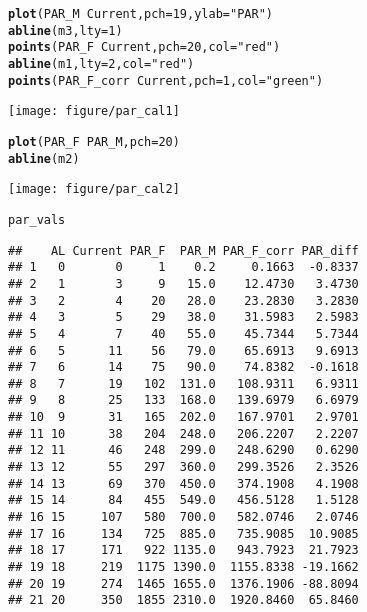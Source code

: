 \documentclass[12pt,a4paper,draft]{article}\usepackage[]{graphicx}\usepackage[]{color}
\makeatletter
\def\maxwidth{ %
  \ifdim\Gin@nat@width>\linewidth
    \linewidth
  \else
    \Gin@nat@width
  \fi
}
\newcommand{\hlnum}[1]{\textcolor[rgb]{0.686,0.059,0.569}{#1}}%
\newcommand{\hlstr}[1]{\textcolor[rgb]{0.192,0.494,0.8}{#1}}%
\newcommand{\hlopt}[1]{\textcolor[rgb]{0,0,0}{#1}}%
\newcommand{\hlstd}[1]{\textcolor[rgb]{0.345,0.345,0.345}{#1}}%
\newcommand{\hlkwc}[1]{\textcolor[rgb]{0.333,0.667,0.333}{#1}}%
\newcommand{\hlkwd}[1]{\textcolor[rgb]{0.737,0.353,0.396}{\textbf{#1}}}%
\newenvironment{kframe}{%
 \def\at@end@of@kframe{}%
 \ifinner\ifhmode%
  \def\at@end@of@kframe{\end{minipage}}%
  \begin{minipage}{\columnwidth}%
 \fi\fi%
 \def\FrameCommand##1{\hskip\@totalleftmargin \hskip-\fboxsep
 \colorbox{shadecolor}{##1}\hskip-\fboxsep
     \hskip-\linewidth \hskip-\@totalleftmargin \hskip\columnwidth}%
 \MakeFramed {\advance\hsize-\width
   \@totalleftmargin\z@ \linewidth\hsize
   \@setminipage}}%
 {\par\unskip\endMakeFramed%
 \at@end@of@kframe}
\newenvironment{knitrout}{}{} %
\makeatother
\begin{document}
\begin{knitrout}
\begin{kframe}
\begin{alltt}
\hlkwd{plot}\hlstd{(PAR_M}\hlopt{~}\hlstd{Current,} \hlkwc{pch}\hlstd{=}\hlnum{19}\hlstd{,} \hlkwc{ylab}\hlstd{=}\hlstr{"PAR"}\hlstd{)}
\hlkwd{abline}\hlstd{(m3,} \hlkwc{lty}\hlstd{=}\hlnum{1}\hlstd{)}
\hlkwd{points}\hlstd{(PAR_F}\hlopt{~}\hlstd{Current,} \hlkwc{pch}\hlstd{=}\hlnum{20}\hlstd{,} \hlkwc{col}\hlstd{=}\hlstr{"red"}\hlstd{)}
\hlkwd{abline}\hlstd{(m1,} \hlkwc{lty}\hlstd{=}\hlnum{2}\hlstd{,} \hlkwc{col}\hlstd{=}\hlstr{"red"}\hlstd{)}
\hlkwd{points}\hlstd{(PAR_F_corr}\hlopt{~}\hlstd{Current,} \hlkwc{pch}\hlstd{=}\hlnum{1}\hlstd{,} \hlkwc{col}\hlstd{=}\hlstr{"green"}\hlstd{)}
\end{alltt}
\end{kframe}
\texttt{[image: figure/par\_cal1]} 
\begin{kframe}\begin{alltt}
\hlkwd{plot}\hlstd{(PAR_F}\hlopt{~}\hlstd{PAR_M,} \hlkwc{pch}\hlstd{=}\hlnum{20}\hlstd{)}
\hlkwd{abline}\hlstd{(m2)}
\end{alltt}
\end{kframe}
\texttt{[image: figure/par\_cal2]} 
\begin{kframe}\begin{alltt}
\hlstd{par_vals}
\end{alltt}
\begin{verbatim}
##    AL Current PAR_F  PAR_M PAR_F_corr PAR_diff
## 1   0       0     1    0.2     0.1663  -0.8337
## 2   1       3     9   15.0    12.4730   3.4730
## 3   2       4    20   28.0    23.2830   3.2830
## 4   3       5    29   38.0    31.5983   2.5983
## 5   4       7    40   55.0    45.7344   5.7344
## 6   5      11    56   79.0    65.6913   9.6913
## 7   6      14    75   90.0    74.8382  -0.1618
## 8   7      19   102  131.0   108.9311   6.9311
## 9   8      25   133  168.0   139.6979   6.6979
## 10  9      31   165  202.0   167.9701   2.9701
## 11 10      38   204  248.0   206.2207   2.2207
## 12 11      46   248  299.0   248.6290   0.6290
## 13 12      55   297  360.0   299.3526   2.3526
## 14 13      69   370  450.0   374.1908   4.1908
## 15 14      84   455  549.0   456.5128   1.5128
## 16 15     107   580  700.0   582.0746   2.0746
## 17 16     134   725  885.0   735.9085  10.9085
## 18 17     171   922 1135.0   943.7923  21.7923
## 19 18     219  1175 1390.0  1155.8338 -19.1662
## 20 19     274  1465 1655.0  1376.1906 -88.8094
## 21 20     350  1855 2310.0  1920.8460  65.8460
\end{verbatim}
\end{kframe}
\end{knitrout}
\end{document}
